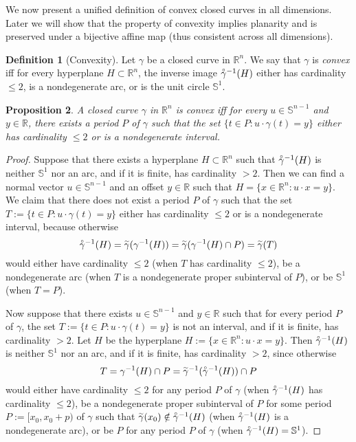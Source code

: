 \documentclass{amsart}
\newtheorem{proposition}{Proposition}[section]
\theoremstyle{definition}
\newtheorem{definition}[proposition]{Definition}
\theoremstyle{remark}
\newcommand{\lring}[1]{\accentset{\circ}{#1}}
\newcommand{\ltilde}[1]{\accentset{\sim}{#1}}
\begin{document}
We now present a unified definition of convex closed curves in
all dimensions. Later we will show that the property of convexity
implies planarity and is preserved under a bijective affine map
(thus consistent across all dimensions).

\begin{definition}[Convexity]
    Let $\gamma$ be a closed curve in $\mathbb{R}^n$.
    We say that $\gamma$ is \emph{convex} iff
    for every hyperplane $H\subset\mathbb{R}^n$,
    the inverse image $\lring{\gamma}^{-1}(H)$ either
    has cardinality $\le2$, is a nondegenerate arc,
    or is the unit circle $\mathbb{S}^1$.
\end{definition}

\begin{proposition}
    \label{pro:convex_equiv}
    A closed curve $\gamma$ in $\mathbb{R}^n$ is convex
    iff for every $u\in\mathbb{S}^{n-1}$ and $y\in\mathbb{R}$,
    there exists a period $P$ of $\gamma$ such that
    the set $\{t\in P:u\cdot\gamma(t)=y\}$ either
    has cardinality $\le2$ or is a nondegenerate interval.
\end{proposition}

\begin{proof}
    Suppose that there exists a hyperplane $H\subset\mathbb{R}^n$
    such that $\lring{\gamma}^{-1}(H)$ is neither $\mathbb{S}^1$
    nor an arc, and if it is finite, has cardinality $>2$.
    Then we can find a normal vector $u\in\mathbb{S}^{n-1}$ and an
    offset $y\in\mathbb{R}$ such that
    $H=\{x\in\mathbb{R}^n:u\cdot x=y\}$.
    We claim that there does not exist a period $P$ of $\gamma$
    such that the set $T:=\{t\in P:u\cdot\gamma(t)=y\}$
    either has cardinality $\le2$ or is a nondegenerate interval,
    because otherwise
    \[\lring{\gamma}^{-1}(H)
        =\ltilde{\gamma}(\gamma^{-1}(H))
        =\ltilde{\gamma}(\gamma^{-1}(H)\cap P)
        =\ltilde{\gamma}(T)\]
    would either have cardinality $\le2$
    (when $T$ has cardinality $\le2$),
    be a nondegenerate arc (when $T$ is a nondegenerate
    proper subinterval of $P$),
    or be $\mathbb{S}^1$ (when $T=P$).

    Now suppose that there exists $u\in\mathbb{S}^{n-1}$ and
    $y\in\mathbb{R}$ such that for every period $P$ of $\gamma$,
    the set $T:=\{t\in P:u\cdot\gamma(t)=y\}$ is not an interval,
    and if it is finite, has cardinality $>2$.
    Let $H$ be the hyperplane $H:=\{x\in\mathbb{R}^n:u\cdot x=y\}$.
    Then $\lring{\gamma}^{-1}(H)$ is neither $\mathbb{S}^1$
    nor an arc, and if it is finite, has cardinality $>2$,
    since otherwise \[T=\gamma^{-1}(H)\cap P
        =\ltilde{\gamma}^{-1}(\lring{\gamma}^{-1}(H))\cap P\]
    would either have cardinality $\le2$ for any period $P$ of
    $\gamma$ (when $\lring{\gamma}^{-1}(H)$ has cardinality $\le2$),
    be a nondegenerate proper subinterval of $P$ for some period
    $P:=[x_0,x_0+p)$ of $\gamma$ such that
    $\ltilde{\gamma}(x_0)\notin\lring{\gamma}^{-1}(H)$
    (when $\lring{\gamma}^{-1}(H)$ is a nondegenerate arc),
    or be $P$ for any period $P$ of $\gamma$
    (when $\lring{\gamma}^{-1}(H)=\mathbb{S}^1$).
\end{proof}
\end{document}
